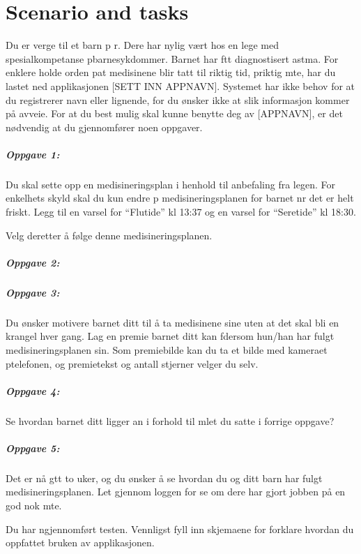 \chapter{Scenario and tasks}
\label{app:scenarioandtasks}


Du er verge til et barn p \a r. Dere har nylig v\ae rt hos en lege med spesialkompetanse p\a barnesykdommer.
Barnet har f\a tt diagnostisert astma. For \a enklere holde orden p\a at medisinene blir tatt til riktig tid, p\a riktig m\a te, 
har du lastet ned applikasjonen [SETT INN APPNAVN]. Systemet har ikke behov for at du registrerer navn eller lignende, 
for du \o nsker ikke at slik informasjon kommer på avveie. For at du best mulig skal kunne benytte deg av [APPNAVN], er det
n\o dvendig at du gjennomf\o rer noen oppgaver.

\paragraph{Oppgave 1:}
Du skal sette opp en medisineringsplan i henhold til anbefaling fra legen. For enkelhets skyld skal du kun endre p\a
medisineringsplanen for barnet n\a r det er helt friskt. Legg til en varsel for ``Flutide'' kl 13:37 og en varsel for ``Seretide'' kl 18:30.

Velg deretter å f\o lge denne medisineringsplanen.


\paragraph{Oppgave 2:}



\paragraph{Oppgave 3:}
Du \o nsker \a motivere barnet ditt til å ta medisinene sine uten at det skal bli en krangel hver gang.
Lag en premie barnet ditt kan f\a dersom hun/han har fulgt medisineringsplanen sin.
Som premiebilde kan du ta et bilde med kameraet p\a telefonen, og premietekst og antall stjerner velger du selv.


\paragraph{Oppgave 4:}
Se hvordan barnet ditt ligger an i forhold til m\a let du satte i forrige oppgave?


\paragraph{Oppgave 5:}
Det er nå g\a tt to uker, og du \o nsker å se hvordan du og ditt barn har fulgt medisineringsplanen. 
Let gjennom loggen for \a se om dere har gjort jobben på en god nok m\a te.



Du har n\a gjennomf\o rt testen. Vennligst fyll inn skjemaene for \a forklare hvordan du oppfattet bruken av applikasjonen.
